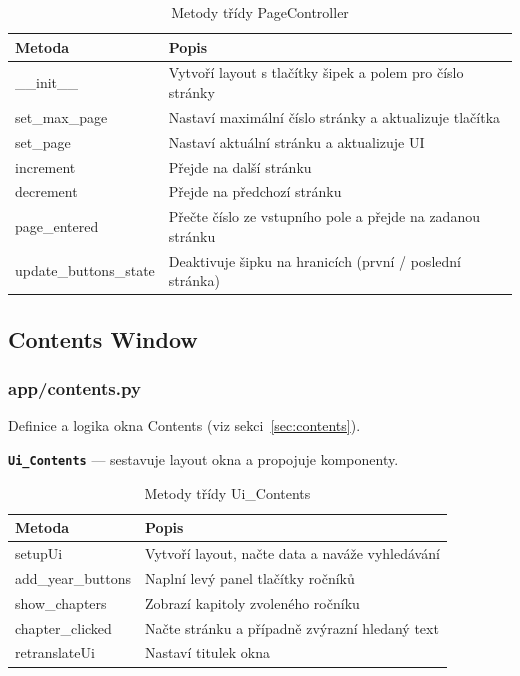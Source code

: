 \documentclass[FM,Proj]{tulthesis}
\begin{document}
\begin{table}[H]
	\centering
	\caption{Metody třídy PageController}
	\begin{tabularx}{\textwidth}{|l|X|}
		\hline
		\textbf{Metoda} & \textbf{Popis} \\ \hline
		\_\_init\_\_           & Vytvoří layout s tlačítky šipek a polem pro číslo stránky \\ \hline
		set\_max\_page         & Nastaví maximální číslo stránky a aktualizuje tlačítka \\ \hline
		set\_page              & Nastaví aktuální stránku a aktualizuje UI \\ \hline
		increment              & Přejde na další stránku \\ \hline
		decrement              & Přejde na předchozí stránku \\ \hline
		page\_entered          & Přečte číslo ze vstupního pole a přejde na zadanou stránku \\ \hline
		update\_buttons\_state & Deaktivuje šipku na hranicích (první / poslední stránka) \\ \hline
	\end{tabularx}
	\label{tab:pagecontroller}
\end{table}

\clearpage

\subsection{Contents Window}

\subsubsection{app/contents.py}

Definice a logika okna Contents (viz sekci~\ref{sec:contents}).

\textbf{\texttt{Ui\_Contents}} — sestavuje layout okna a propojuje komponenty.

\begin{table}[H]
	\centering
	\caption{Metody třídy Ui\_Contents}
	\begin{tabularx}{\textwidth}{|l|X|}
		\hline
		\textbf{Metoda} & \textbf{Popis} \\ \hline
		setupUi            & Vytvoří layout, načte data a naváže vyhledávání \\ \hline
		add\_year\_buttons & Naplní levý panel tlačítky ročníků \\ \hline
		show\_chapters     & Zobrazí kapitoly zvoleného ročníku \\ \hline
		chapter\_clicked   & Načte stránku a případně zvýrazní hledaný text \\ \hline
		retranslateUi      & Nastaví titulek okna \\ \hline
	\end{tabularx}
	\label{tab:uicontents}
\end{table}
\end{document}
